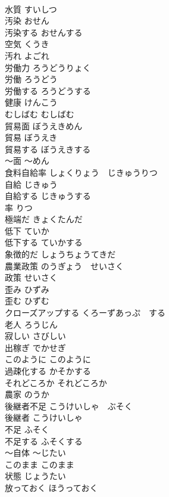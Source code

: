 \documentclass[8pt]{extreport}
\begin{document}
\begin{CJK}{UTF8}{min}
\\	水質	すいしつ	
\\	汚染	おせん	
\\	汚染する	おせんする	
\\	空気	くうき	
\\	汚れ	よごれ	
\\	労働力	ろうどうりょく	
\\	労働	ろうどう	
\\	労働する	ろうどうする	
\\	健康	けんこう	
\\	むしばむ	むしばむ	
\\	貿易面	ぼうえきめん	
\\	貿易	ぼうえき	
\\	貿易する	ぼうえきする	
\\	〜面	〜めん	
\\	食料自給率	しょくりょう　じきゅうりつ	
\\	自給	じきゅう	
\\	自給する	じきゅうする	
\\	率	りつ	
\\	極端だ	きょくたんだ	
\\	低下	ていか	
\\	低下する	ていかする	
\\	象徴的だ	しょうちょうてきだ	
\\	農業政策	のうぎょう　せいさく	
\\	政策	せいさく	
\\	歪み	ひずみ	
\\	歪む	ひずむ	
\\	クローズアップする	くろーずあっぷ　する	
\\	老人	ろうじん	
\\	寂しい	さびしい	
\\	出稼ぎ	でかせぎ	
\\	このように	このように	
\\	過疎化する	かそかする	
\\	それどころか	それどころか	
\\	農家	のうか	
\\	後継者不足	こうけいしゃ　ぶそく	
\\	後継者	こうけいしゃ	
\\	不足	ふそく	
\\	不足する	ふそくする	
\\	〜自体	〜じたい	
\\	このまま	このまま	
\\	状態	じょうたい	
\\	放っておく	ほうっておく	

\end{CJK}
\end{document}
